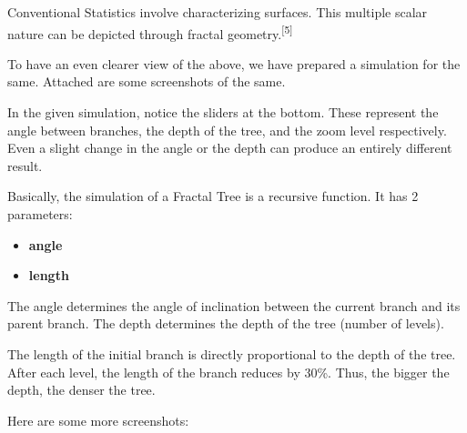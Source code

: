 \documentclass{resonance}
\begin{document}
Conventional Statistics involve characterizing surfaces. This multiple scalar nature can be depicted through fractal geometry.\textsuperscript{[5]}

To have an even clearer view of the above, we have prepared a simulation for the same. Attached are some screenshots of the same.

In the given simulation, notice the sliders at the bottom. These represent the angle between branches, the depth of the tree, and the zoom level respectively. Even a slight change in the angle or the depth can produce an entirely different result.

Basically, the simulation of a Fractal Tree is a recursive function. It has 2 parameters:
\begin{itemize}
    \item \textbf{angle}
    \item \textbf{length}
\end{itemize}

The angle determines the angle of inclination between the current branch and its parent branch. The depth determines the depth of the tree (number of levels).

The length of the initial branch is directly proportional to the depth of the tree. After each level, the length of the branch reduces by 30\%. Thus, the bigger the depth, the denser the tree.

Here are some more screenshots:\\

\begin{figure}[h]
\hskip 3.27cm
\vspace{40pt}
\end{figure}
\end{document}
